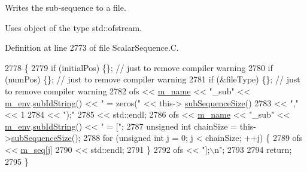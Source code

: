 Writes the sub-\/sequence to a file. 

Uses object of the type std\-::ofstream. 

Definition at line 2773 of file Scalar\-Sequence.\-C.


\begin{DoxyCode}
2778 \{
2779   \textcolor{keywordflow}{if} (initialPos) \{\}; \textcolor{comment}{// just to remove compiler warning}
2780   \textcolor{keywordflow}{if} (numPos)     \{\}; \textcolor{comment}{// just to remove compiler warning}
2781   \textcolor{keywordflow}{if} (&fileType)  \{\}; \textcolor{comment}{// just to remove compiler warning}
2782   ofs << \hyperlink{class_q_u_e_s_o_1_1_scalar_sequence_a8568f3ceb7cef2c4e3cf6dbf52d43cdf}{m\_name} << \textcolor{stringliteral}{"\_sub"} << \hyperlink{class_q_u_e_s_o_1_1_scalar_sequence_a71618cd6351b29361b437af68447a4c8}{m\_env}.\hyperlink{class_q_u_e_s_o_1_1_base_environment_a73f7849acdd5d5ba15a3094fe18f258f}{subIdString}() << \textcolor{stringliteral}{" = zeros("} << this->
      \hyperlink{class_q_u_e_s_o_1_1_scalar_sequence_a0288ea295eedc216a1617b3286f6f3a0}{subSequenceSize}()
2783       << \textcolor{stringliteral}{","}                                                    << 1
2784       << \textcolor{stringliteral}{");"}
2785       << std::endl;
2786   ofs << \hyperlink{class_q_u_e_s_o_1_1_scalar_sequence_a8568f3ceb7cef2c4e3cf6dbf52d43cdf}{m\_name} << \textcolor{stringliteral}{"\_sub"} << \hyperlink{class_q_u_e_s_o_1_1_scalar_sequence_a71618cd6351b29361b437af68447a4c8}{m\_env}.\hyperlink{class_q_u_e_s_o_1_1_base_environment_a73f7849acdd5d5ba15a3094fe18f258f}{subIdString}() << \textcolor{stringliteral}{" = ["};
2787   \textcolor{keywordtype}{unsigned} \textcolor{keywordtype}{int} chainSize = this->\hyperlink{class_q_u_e_s_o_1_1_scalar_sequence_a0288ea295eedc216a1617b3286f6f3a0}{subSequenceSize}();
2788   \textcolor{keywordflow}{for} (\textcolor{keywordtype}{unsigned} \textcolor{keywordtype}{int} j = 0; j < chainSize; ++j) \{
2789     ofs << \hyperlink{class_q_u_e_s_o_1_1_scalar_sequence_ae616036fd2e62fb69df167814545e893}{m\_seq}[j]
2790         << std::endl;
2791   \}
2792   ofs << \textcolor{stringliteral}{"];\(\backslash\)n"};
2793 
2794   \textcolor{keywordflow}{return};
2795 \}
\end{DoxyCode}
